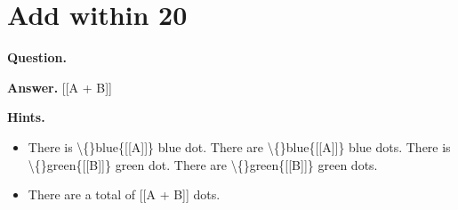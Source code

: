 \documentclass{article}
\begin{document}
\section*{Add within 20}
\textbf{Question.} 

\textbf{Answer.} [[A + B]]

\textbf{Hints.}
\begin{itemize}
  \item There is \textbackslash\{\}blue\{[[A]]\} blue dot.
                        There are \textbackslash\{\}blue\{[[A]]\} blue dots.
                        There is \textbackslash\{\}green\{[[B]]\} green dot.
                        There are \textbackslash\{\}green\{[[B]]\} green dots.
  \item There are a total of [[A + B]] dots.
\end{itemize}
\end{document}
